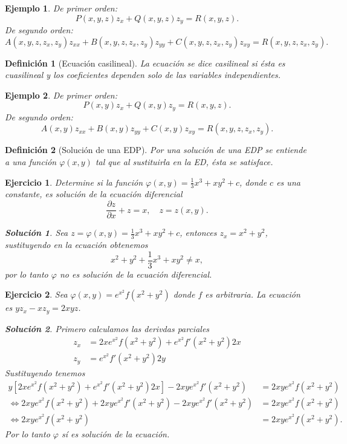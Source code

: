\documentclass[11pt,letterpaper,draft]{report}
\newtheorem{defn}{Definición}
\newtheorem{example}{Ejemplo}[section]
\newtheorem{exe}{Ejercicio}
\newtheorem*{sol}{Solución}
\newcommand\<{\langle}
\renewcommand\>{\rangle}
\renewcommand\phi\varphi
\begin{document}
\begin{example}
  De primer orden:
  \[
    P(x,y,z)z_x + Q(x,y,z) z_y = R(x,y,z).
  \] 
  De segundo orden:
  \[
    A(x,y,z,z_x,z_y) z_{xx} + B(x,y,z,z_x,z_y) z_{yy} +
    C(x,y,z,z_x,z_y) z_{xy} = R(x,y,z,z_x,z_y).
  \] 
\end{example}

\begin{defn}[Ecuación casilineal]
  La ecuación se dice casilineal si ésta es cuasilineal y
  los coeficientes dependen solo de las variables
  independientes.
\end{defn}

\begin{example}
  De primer orden:
  \[
    P(x,y)z_x + Q(x,y) z_y = R(x,y,z).
  \] 
  De segundo orden:
  \[
    A(x,y) z_{xx} + B(x,y) z_{yy} +
    C(x,y) z_{xy} = R(x,y,z,z_x,z_y).
  \] 

\end{example}

\begin{defn}[Solución de una EDP]
  Por una solución de una EDP se entiende a una función
  $\phi(x,y)$ tal que al sustituirla en la ED, ésta se
  satisface.
\end{defn}

\begin{exe}
  Determine si la función $\displaystyle \phi(x,y) =
  \frac{1}{3}x^3 + xy^2 + c$, donde $c$ es una constante, es
  solución de la ecuación diferencial
  \[
    \frac{\partial z}{\partial x} + z = x, \quad z = z(x,y).
  \] 

  \begin{sol}
    Sea $z = \phi(x,y) = \frac{1}{3}x^3 + xy^2 + c$,
    entonces $z_x = x^2 + y^2$, sustituyendo en la ecuación
    obtenemos
    \[
    x^2 + y^2 + \frac{1}{3}x^3 + xy^2 \neq x,
    \] por lo tanto $\phi$ no es solución de la ecuación
    diferencial.
  \end{sol}
\end{exe}

\begin{exe}
  Sea $\phi(x,y) = e^{x^2}f(x^2+y^2)$ donde $f$ es
  arbitraria. La ecuación es $y z_x - x z_y = 2xyz$.
  
  \begin{sol}
    Primero calculamos las derivdas parciales
    \begin{align*}
      z_x &= 2x e^{x^2} f(x^2 + y^2) + e^{x^2} f'(x^2
      +y^2)2x\\
      z_y &= e^{x^2} f'(x^2+y^2)2y
    \end{align*} 
    Sustituyendo tenemos
    \begin{align*}
      y\left[2x e^{x^2} f(x^2+y^2) + e^{x^2} f'(x^2+y^2)
      2x\right] - 2xy e^{x^2} f'(x^2+y^2) &= 2xy e^{x^2}
      f(x^2+y^2)\\
      \iff 2xy e^{x^2} f(x^2+y^2) + 2xy e^{x^2} f'(x^2+y^2) - 2xy
      e^{x^2} f'(x^2+y^2) &= 2xy e^{x^2} f(x^2+y^2)\\
      \iff 2xy e^{x^2} f(x^2+y^2) &= 2xy e^{x^2} f(x^2+y^2).
    \end{align*} Por lo tanto $\phi$ sí es solución de la
    ecuación.
  \end{sol}
\end{exe}
\end{document}
